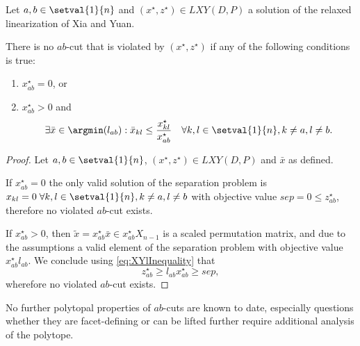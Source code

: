 \begin{proposition}
\label{prop:cond_on_cuts}
	Let $a,b\in\setval{1}{n}$ and $(x^\star,z^\star)\in LXY(D,P)$ a solution of the relaxed linearization of Xia and Yuan.
	
	There is no $ab$-cut that is violated by $(x^\star, z^\star)$ if any of the following conditions is true:
	\begin{enumerate}
		\item $x^\star_{ab} = 0$, or
		\item $x^\star_{ab} > 0$ and
			\begin{equation*}
				\exists \bar{x}\in\argmin(l_{ab}): \bar{x}_{kl} \leq \frac{x^\star_{kl}}{x^\star_{ab}}\quad\forall k,l\in\setval{1}{n}, k\neq a, l\neq b.
			\end{equation*}
	\end{enumerate}
\end{proposition}
\begin{proof}
	Let $a,b\in\setval{1}{n}$, $(x^\star,z^\star)\in LXY(D,P)$ and $\bar{x}$ as defined. 
	
	If $x^\star_{ab} = 0$ the only valid solution of the separation problem is $x_{kl}=0\;\forall k,l\in\setval{1}{n}, k\neq a, l\neq b$ with objective value $sep = 0 \leq z^\star_{ab}$, therefore no violated $ab$-cut exists.
	
	If $x^\star_{ab} > 0$, then $\tilde{x} = x^\star_{ab}\bar{x}\in x^\star_{ab}X_{n-1}$ is a scaled permutation matrix, and due to the assumptions a valid element of the separation problem with objective value $x^\star_{ab}l_{ab}$. We conclude using \eqref{eq:XYlInequality} that
	\begin{equation*}
		z^\star_{ab}\geq l_{ab}x^\star_{ab} \geq sep,
	\end{equation*}
	wherefore no violated $ab$-cut exists.
\end{proof}

No further polytopal properties of $ab$-cuts are known to date, especially questions whether they are facet-defining or can be lifted further require additional analysis of the polytope. 

